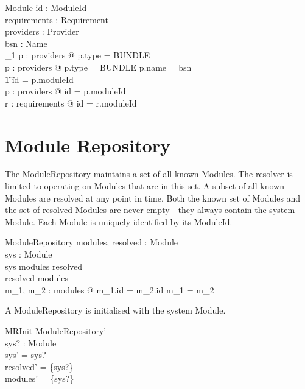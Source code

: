 \documentclass[a4paper,9pt]{article}
\begin{document}
\begin{schema}{Module}
 id : ModuleId \\
 requirements : \power Requirement \\
 providers : \power Provider \\
 bsn : Name \\
\where
 \exists_1 p : providers @ p.type = BUNDLE \\
 \forall p : providers @  p.type = BUNDLE \implies p.name = bsn \land \\
 \t1 id = p.moduleId \\
 \forall p : providers @ id = p.moduleId \\
 \forall r : requirements @ id = r.moduleId \\
\end{schema}

\clearpage
\section{Module Repository}
\label{cha:modulerepository}

The ModuleRepository maintains a set of all known Modules. The resolver is limited to operating
on Modules that are in this set. A subset of all known Modules are resolved at any point
in time. Both the known set of Modules and the set of resolved Modules are never empty - they always contain the system Module. Each Module is uniquely identified by its ModuleId.

\begin{schema}{ModuleRepository}
	modules, resolved : \power Module \\
	sys : Module \\
\where
	sys \in modules \cap resolved \\
	resolved \subseteq modules \\
	\forall m_1, m_2 : modules @ m_1.id = m_2.id \implies m_1 = m_2
\end{schema}

A ModuleRepository is initialised with the system Module.

\begin{schema}{MRInit}
 ModuleRepository' \\
 sys? : Module \\
\where
 sys' = sys? \\ 
 resolved' = \{sys?\} \\
 modules' = \{sys?\} \\
\end{schema}
\end{document}
